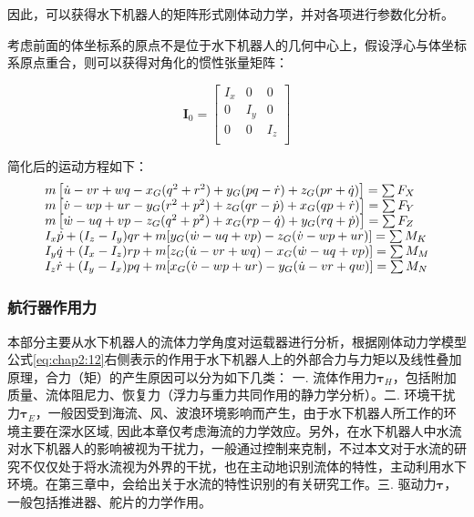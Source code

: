 因此，可以获得水下机器人的矩阵形式刚体动力学，并对各项进行参数化分析。

考虑前面的体坐标系的原点不是位于水下机器人的几何中心上，假设浮心与体坐标系原点重合，则可以获得对角化的惯性张量矩阵：

\begin{equation}
\label{eq:chap2:15}
\bm{I}_0 = \begin{bmatrix}
 I_x  & 0    &  0   \\
 0    & I_y  &  0   \\
 0    & 0    &  I_z \\
\end{bmatrix}
\end{equation}

简化后的运动方程如下：
\begin{equation}
\centering
\label{eq:chap2:16}
\begin{array}{l}
 m\left[ {\dot u - vr + wq - {x_G}({q^2} + {r^2}) + {y_G}(pq - \dot r) + {z_G}(pr + \dot q)} \right] = \sum {{F_X}}  \\
 m\left[ {\dot v - wp + ur - {y_G}({r^2} + {p^2}) + {z_G}(qr - \dot p) + {x_G}(qp + \dot r)} \right] = \sum {{F_Y}}  \\
 m\left[ {\dot w - uq + vp - {z_G}({q^2} + {p^2}) + {x_G}(rp - \dot q) + {y_G}(rq + \dot p)} \right] = \sum {{F_Z}}  \\
 {I_x}\dot p + ({I_z} - {I_y})qr + m[{y_G}(\dot w - uq + vp) - {z_G}(\dot v - wp + ur)] = \sum {{M_K}}  \\
 {I_y}\dot q + ({I_x} - {I_z})rp + m[{z_G}(\dot u - vr + wq) - {x_G}(\dot w - uq + vp)] = \sum {{M_M}}  \\
 {I_z}\dot r + ({I_y} - {I_x})pq + m[{x_G}(\dot v - wp + ur) - {y_G}(\dot u - vr + qw)] = \sum {{M_N}}  \\
 \end{array}
 \end{equation}

\subsubsection{航行器作用力 }

本部分主要从水下机器人的流体力学角度对运载器进行分析，根据刚体动力学模型公式\ref{eq:chap2:12}右侧表示的作用于水下机器人上的外部合力与力矩以及线性叠加原理，合力（矩）的产生原因可以分为如下几类：
一. 流体作用力$\bm{\tau}_{H}$，包括附加质量、流体阻尼力、恢复力（浮力与重力共同作用的静力学分析）。二. 环境干扰力$\bm{\tau}_E$，一般因受到海流、风、波浪环境影响而产生，由于水下机器人所工作的环境主要在深水区域, 因此本章仅考虑海流的力学效应。另外，在水下机器人中水流对水下机器人的影响被视为干扰力，一般通过控制来克制，不过本文对于水流的研究不仅仅处于将水流视为外界的干扰，也在主动地识别流体的特性，主动利用水下环境。在第三章中，会给出关于水流的特性识别的有关研究工作。三. 驱动力$\bm{\tau}$，一般包括推进器、舵片的力学作用。

